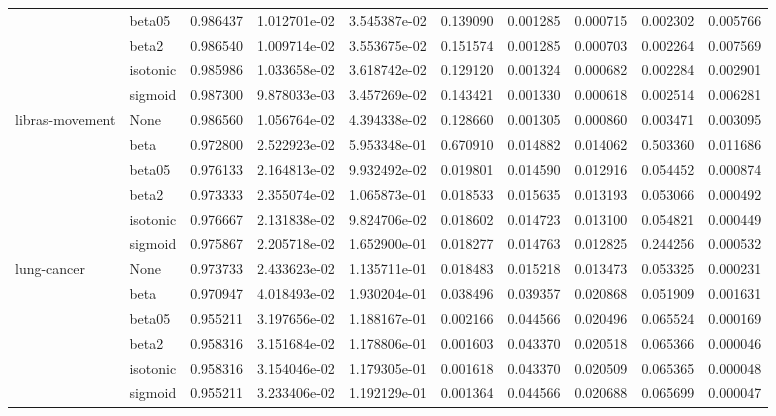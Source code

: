 \begin{tabular}{llrrrrrrrr}
        & beta05 &  0.986437 &  1.012701e-02 &  3.545387e-02 &   0.139090 &  0.001285 &  0.000715 &  0.002302 &  0.005766 \\
        & beta2 &  0.986540 &  1.009714e-02 &  3.553675e-02 &   0.151574 &  0.001285 &  0.000703 &  0.002264 &  0.007569 \\
        & isotonic &  0.985986 &  1.033658e-02 &  3.618742e-02 &   0.129120 &  0.001324 &  0.000682 &  0.002284 &  0.002901 \\
        & sigmoid &  0.987300 &  9.878033e-03 &  3.457269e-02 &   0.143421 &  0.001330 &  0.000618 &  0.002514 &  0.006281 \\
libras-movement & None &  0.986560 &  1.056764e-02 &  4.394338e-02 &   0.128660 &  0.001305 &  0.000860 &  0.003471 &  0.003095 \\
        & beta &  0.972800 &  2.522923e-02 &  5.953348e-01 &   0.670910 &  0.014882 &  0.014062 &  0.503360 &  0.011686 \\
        & beta05 &  0.976133 &  2.164813e-02 &  9.932492e-02 &   0.019801 &  0.014590 &  0.012916 &  0.054452 &  0.000874 \\
        & beta2 &  0.973333 &  2.355074e-02 &  1.065873e-01 &   0.018533 &  0.015635 &  0.013193 &  0.053066 &  0.000492 \\
        & isotonic &  0.976667 &  2.131838e-02 &  9.824706e-02 &   0.018602 &  0.014723 &  0.013100 &  0.054821 &  0.000449 \\
        & sigmoid &  0.975867 &  2.205718e-02 &  1.652900e-01 &   0.018277 &  0.014763 &  0.012825 &  0.244256 &  0.000532 \\
lung-cancer & None &  0.973733 &  2.433623e-02 &  1.135711e-01 &   0.018483 &  0.015218 &  0.013473 &  0.053325 &  0.000231 \\
        & beta &  0.970947 &  4.018493e-02 &  1.930204e-01 &   0.038496 &  0.039357 &  0.020868 &  0.051909 &  0.001631 \\
        & beta05 &  0.955211 &  3.197656e-02 &  1.188167e-01 &   0.002166 &  0.044566 &  0.020496 &  0.065524 &  0.000169 \\
        & beta2 &  0.958316 &  3.151684e-02 &  1.178806e-01 &   0.001603 &  0.043370 &  0.020518 &  0.065366 &  0.000046 \\
        & isotonic &  0.958316 &  3.154046e-02 &  1.179305e-01 &   0.001618 &  0.043370 &  0.020509 &  0.065365 &  0.000048 \\
        & sigmoid &  0.955211 &  3.233406e-02 &  1.192129e-01 &   0.001364 &  0.044566 &  0.020688 &  0.065699 &  0.000047 \\

\end{tabular}
